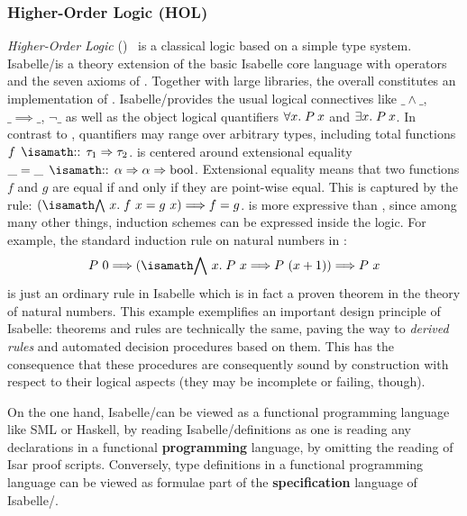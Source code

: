 \subsubsection{Higher-Order Logic (HOL)}
\emph{Higher-Order Logic}
(\HOL)~\cite{church:types:1940,andrews:introduction:2002} is a
classical logic based on a simple type system. Isabelle/\HOL is a
theory extension of the basic Isabelle core language with operators
and the seven axioms of \HOL. Together with large libraries, the
overall constitutes an implementation of \HOL.
Isabelle/\HOL provides the usual logical connectives like $\_ \land
\_$, $\_ \implies\_$, $\lnot \_ $ as well as the object logical
quantifiers $\forall x.\; P\: x$ and $\exists x.\; P\: x$. In
contrast to \FOL, quantifiers may range over arbitrary types, including
total functions $f \ap\ofType\ap \tau_1 \Rightarrow \tau_2$. \HOL is
centered around extensional equality $\_ = \_ \ap\ofType\ap \alpha
\Rightarrow \alpha \Rightarrow \text{bool}$. Extensional equality
means that two functions $f$ and $g$ are equal if and only if they are
point-wise equal. This is captured by the rule: $(\Forall~x\spot f~x =
g~x) \Longrightarrow f = g$.  \HOL is more expressive than \FOL, since
among many other things, induction schemes can be expressed inside the
logic. For example, the standard induction rule on natural numbers in
\HOL:
\begin{gather*}
  P~0 \Longrightarrow (\Forall~x\spot P~x \Longrightarrow P~(x+1)) \Longrightarrow P~x
\end{gather*}
is just an ordinary rule in Isabelle which is in fact a proven theorem
in the theory of natural numbers. This example exemplifies an
important design principle of Isabelle: theorems and rules are
technically the same, paving the way to \emph{derived rules} and
automated decision procedures based on them. This has the consequence
that these procedures are consequently sound by construction with
respect to their logical aspects (they may be incomplete or failing,
though).

On the one hand, Isabelle/\HOL can be viewed as a functional
programming language like SML or
Haskell, by reading Isabelle/\HOL definitions as one is reading any
declarations in a functional \textbf{programming} language, \ie by
omitting the reading of Isar proof scripts. Conversely, type
definitions in a functional programming language can be viewed as
formulae part of the \textbf{specification} language of
Isabelle/\HOL.


